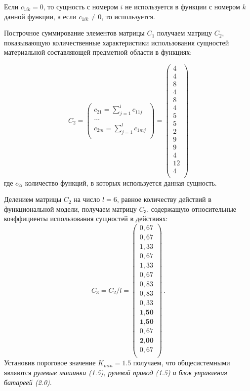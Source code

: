 Если $c_{1ik} = 0$, то сущность с номером $i$ не используется в функции с номером $k$ данной функции,
а если $c_{1ik} \ne 0$, то используется.

Построчное суммирование элементов матрицы $C_1$ получаем матрицу $C_2$, показывающую количественные характеристики
использования сущностей материальной составляющей предметной области в функциях:

\begin{equation*}
    C_2 = \begin{pmatrix}
        c_{21} = \sum_{j=1}^l c_{11j} \\
        \ldots \\
        c_{2m} = \sum_{j=1}^l c_{1mj} \\
    \end{pmatrix} 
    =
    \begin{pmatrix}
        4 \\
        4 \\
        8 \\
        4 \\
        8 \\
        4 \\
        5 \\
        5 \\
        2 \\
        9 \\
        9 \\
        4 \\
        12 \\
        4 \\
    \end{pmatrix}
\end{equation*}
где $c_{2i}$ количество функций, в которых используется данная сущность.

Делением матрицы $C_2$ на число $l = 6$, равное количеству действий в функциональной модели, получаем матрицу $C_3$,
содержащую относительные коэффициенты использования сущностей в действиях:
\begin{equation}
    C_3 = C_2 / l = \begin{pmatrix}
        0,67 \\
        0,67 \\
        1,33 \\
        0,67 \\
        1,33 \\
        0,67 \\
        0,83 \\
        0,83 \\
        0,33 \\
        \textbf{1,50} \\
        \textbf{1,50} \\
        0,67 \\
        \textbf{2,00} \\
        0,67 \\
    \end{pmatrix}\,.
\end{equation}
Установив пороговое значение $K_{min} = 1.5$ получаем, что общесистемными являются
\textit{рулевые машинки (1.5), рулевой привод (1.5) и блок управления батареей (2.0)}.

